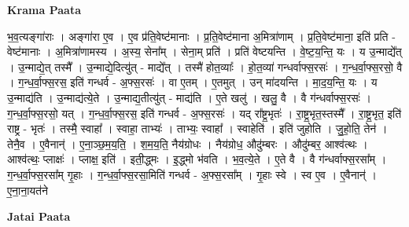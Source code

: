\documentclass[17pt]{extarticle}
\begin{document}
\textbf{Krama Paata} \newline

भ॒व॒त्यङ्गा॑राः । अङ्गा॑रा ए॒व । ए॒व प्र॑ति॒वेष्ट॑मानाः । प्र॒ति॒वेष्ट॑माना अ॒मित्रा॑णाम् । प्र॒ति॒वेष्ट॑माना॒ इति॑ प्रति - वेष्ट॑मानाः । अ॒मित्रा॑णामस्य । अ॒स्य॒ सेना᳚म् । सेना॒म् प्रति॑ । प्रति॑ वेष्टयन्ति । वे॒ष्ट॒य॒न्ति॒ यः । य उ॒न्माद्ये᳚त् । उ॒न्माद्ये॒त् तस्मै᳚ । उ॒न्माद्ये॒दित्यु॑त् - माद्ये᳚त् । तस्मै॑ होत॒व्याः᳚ । हो॒त॒व्या॑ गन्धर्वाफ्स॒रसः॑ । ग॒न्ध॒र्वा॒फ्स॒रसो॒ वै । ग॒न्ध॒र्वा॒फ्स॒रस॒ इति॑ गन्धर्व - अ॒फ्स॒रसः॑ । वा ए॒तम् । ए॒तमुत् । उन् मा॑दयन्ति । मा॒द॒य॒न्ति॒ यः । य उ॒न्माद्य॑ति । उ॒न्माद्य॑त्ये॒ते । उ॒न्माद्य॒तीत्यु॑त् - माद्य॑ति । ए॒ते खलु॑ । खलु॒ वै । वै ग॑न्धर्वाफ्स॒रसः॑ । ग॒न्ध॒र्वा॒फ्स॒रसो॒ यत् । ग॒न्ध॒र्वा॒फ्स॒रस॒ इति॑ गन्धर्व - अ॒फ्स॒रसः॑ । यद् रा᳚ष्ट्र॒भृतः॑ । रा॒ष्ट्र॒भृत॒स्तस्मै᳚ । रा॒ष्ट्र॒भृत॒ इति॑ राष्ट्र - भृतः॑ । तस्मै॒ स्वाहा᳚ । स्वाहा॒ ताभ्यः॑ । ताभ्यः॒ स्वाहा᳚ । स्वाहेति॑ । इति॑ जुहोति । जु॒हो॒ति॒ तेन॑ । तेनै॒व । ए॒वैनान्॑ । ए॒ना॒ञ्छ॒म॒य॒ति॒ । श॒म॒य॒ति॒ नैय॑ग्रोधः । नैय॑ग्रोध॒ औदु॑म्बरः । औदु॑म्बर॒ आश्व॑त्थः । आश्व॑त्थः॒ प्लाक्षः॑ । प्लाक्ष॒ इति॑ । इती॒द्ध्मः । इ॒द्ध्मो भ॑वति । भ॒व॒त्ये॒ते । ए॒ते वै । वै ग॑न्धर्वाफ्स॒रसा᳚म् । ग॒न्ध॒र्वा॒फ्स॒रसा᳚म् गृ॒हाः । ग॒न्ध॒र्वा॒फ्स॒रसा॒मिति॑ गन्धर्व - अ॒फ्स॒रसा᳚म् । गृ॒हाः स्वे । स्व ए॒व । ए॒वैनान्॑ । ए॒ना॒ना॒यत॑ने \newline

\textbf{Jatai Paata} \newline
\end{document}
